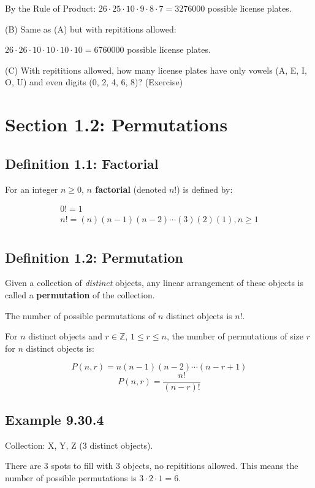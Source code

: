 \documentclass{article}
\begin{document}
By the Rule of Product: $26\cdot25\cdot10\cdot9\cdot8\cdot7=3276000$
possible license plates.

(B) Same as (A) but with repititions allowed:

$26\cdot26\cdot10\cdot10\cdot10\cdot10=6760000$ possible license
plates.

(C) With repititions allowed, how many license plates have only vowels
(A, E, I, O, U) and even digits (0, 2, 4, 6, 8)? (Exercise)

\section*{Section 1.2: Permutations}

\subsection*{Definition 1.1: Factorial}

For an integer $n\ge0$, \textbf{$n$ factorial} (denoted $n!$) is
defined by:

\[
\begin{array}{l}
0!=1 \\
n!=(n)(n-1)(n-2)\cdots(3)(2)(1), n\ge1 \\
\end{array}
\]

\subsection*{Definition 1.2: Permutation}

Given a collection of \textit{distinct} objects, any linear
arrangement of these objects is called a \textbf{permutation} of the
collection.

The number of possible permutations of $n$ distinct objects is $n!$.

For $n$ distinct objects and $r\in\mathbb{Z}$, $1\le{}r\le{}n$, the
number of permutations of size $r$ for $n$ distinct objects is:

\[
P(n,r)=n(n-1)(n-2)\cdots(n-r+1)
\] \[
P(n,r)=\dfrac{n!}{(n-r)!}
\]

\subsection*{Example 9.30.4}

Collection: X, Y, Z (3 distinct objects).

There are 3 spots to fill with 3 objects, no repititions allowed. This
means the number of possible permutations is $3\cdot2\cdot1=6$.
\end{document}
